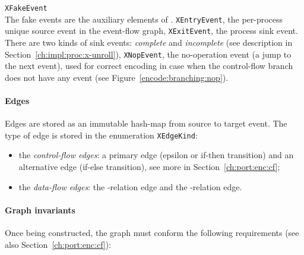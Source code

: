 \begin{outline}
  \1 \texttt{XFakeEvent} \\
    The fake events are the auxiliary elements of \xgraph{}.
    \2 \texttt{XEntryEvent}, the per-process unique source event in the event-flow graph,
    \2 \texttt{XExitEvent}, the process sink event. There are two kinds of sink events: \textit{complete} and \textit{incomplete} (see description in Section~\ref{ch:impl:proc:x-unroll}),
    \2 \texttt{XNopEvent}, the no-operation event (a jump to the next event), used for correct encoding in case when the control-flow branch does not have any event (see Figure~\ref{encode:branching:nop}).
\end{outline}

\paragraph{Edges}
\label{ch:impl:model:xgraph:edges}
Edges are stored as an immutable hash-map from source to target event.
The type of edge is stored in the enumeration \texttt{XEdgeKind}:%
\begin{itemize}[noitemsep]
  \item the \textit{control-flow edges}: a primary edge (epsilon or if-then transition) and an alternative edge (if-else transition), see more in Section~\ref{ch:port:enc:cf};
  \item the \textit{data-flow edges}: the \co-relation edge and the \rf-relation edge. %
\end{itemize}


\paragraph{Graph invariants}
\label{ch:impl:model:xgraph:invariants}
Once being constructed, the graph must conform the following requirements (see also Section~\ref{ch:port:enc:cf}):

